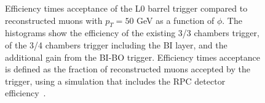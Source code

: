 \begin{figure}[h]
	\centering
\end{figure}	

\begin{figure}[h]
	\centering	
	\caption{Efficiency times acceptance of the L0 barrel trigger compared to reconstructed muons with $p_{T} = 50$ GeV as a function of $\phi$. The histograms show the efficiency of   the existing 3/3 chambers trigger, of  the 3/4 chambers trigger including the BI layer, and  the additional gain from the BI-BO trigger. Efficiency times acceptance is defined as the fraction of reconstructed muons accepted by the trigger, using a simulation that includes the RPC detector efficiency~\cite{Marcoccia:2693982}.}
	\label{fig:allcasesBIRBIM}
\end{figure}	
\FloatBarrier

